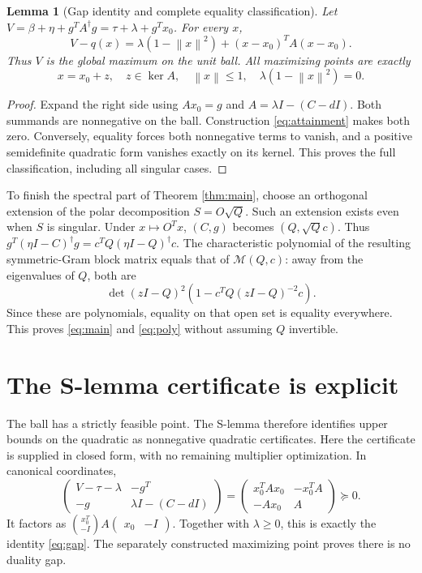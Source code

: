 \documentclass[11pt]{article}
\newtheorem{lemma}[theorem]{Lemma}
\theoremstyle{remark}\newtheorem{remark}[theorem]{Remark}
\newcommand{\norm}[1]{\left\lVert#1\right\rVert}
\begin{document}
\begin{lemma}[Gap identity and complete equality classification]\label{lem:gap}
Let $V=\beta+\eta+g^TA^\dagger g=\tau+\lambda+g^Tx_0$. For every $x$,
\begin{equation}\label{eq:gap}\boxed{
 V-q(x)=\lambda(1-\norm x^2)+(x-x_0)^TA(x-x_0).}
\end{equation}
Thus $V$ is the global maximum on the unit ball. All maximizing points are
exactly
\begin{equation}\label{eq:allmax}
 x=x_0+z,\quad z\in\ker A,\quad \norm x\leq1,
 \quad\lambda(1-\norm x^2)=0.
\end{equation}
\end{lemma}
\begin{proof}
Expand the right side using $Ax_0=g$ and $A=\lambda I-(C-dI)$.
Both summands are nonnegative on the ball. Construction \eqref{eq:attainment}
makes both zero. Conversely, equality forces both nonnegative terms to
vanish, and a positive semidefinite quadratic form vanishes exactly on its
kernel. This proves the full classification, including all singular cases.
\end{proof}

To finish the spectral part of Theorem \ref{thm:main}, choose an orthogonal
extension of the polar decomposition $S=O\sqrt Q$. Such an extension exists
even when $S$ is singular. Under $x\mapsto O^Tx$, $(C,g)$ becomes
$(Q,\sqrt Qc)$. Thus
$g^T(\eta I-C)^\dagger g=c^TQ(\eta I-Q)^\dagger c$.
The characteristic polynomial of the resulting symmetric-Gram block matrix
equals that of $\mathscr M(Q,c)$: away from the eigenvalues of $Q$, both are
\[
 \det(zI-Q)^2\left(1-c^TQ(zI-Q)^{-2}c\right).
\]
Since these are polynomials, equality on that open set is equality
everywhere. This proves \eqref{eq:main} and \eqref{eq:poly} without assuming
$Q$ invertible.

\section{The S-lemma certificate is explicit}

The ball has a strictly feasible point. The S-lemma therefore identifies
upper bounds on the quadratic as nonnegative quadratic certificates. Here
the certificate is supplied in closed form, with no remaining multiplier
optimization. In canonical coordinates,
\begin{equation}\label{eq:slmi}
 \begin{pmatrix}
 V-\tau-\lambda&-g^T\\-g&\lambda I-(C-dI)
 \end{pmatrix}
 =\begin{pmatrix}x_0^TAx_0&-x_0^TA\\-Ax_0&A\end{pmatrix}\succeq0.
\end{equation}
It factors as
$\binom{x_0^T}{-I}A\begin{pmatrix}x_0&-I\end{pmatrix}$.
Together with $\lambda\geq0$, this is exactly the identity
\eqref{eq:gap}. The separately constructed maximizing point proves there is
no duality gap.
\end{document}
